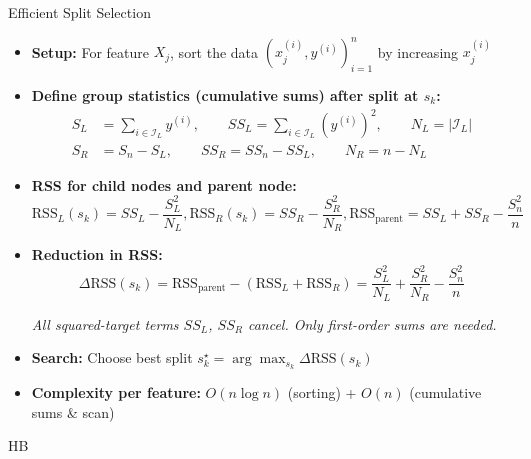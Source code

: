 \documentclass[11pt,compress,t,notes=noshow, aspectratio=169, xcolor=table]{beamer}
\begin{document}
\begin{frame}{Efficient Split Selection}
\begin{itemize}
  \item \textbf{Setup:} For feature \(X_j\), sort the data \((x_j^{(i)}, y^{(i)})_{i=1}^n\) by increasing \(x_j^{(i)}\)


  \item \textbf{Define group statistics (cumulative sums) after split at $s_k$:}
      \[
    \begin{aligned}
      S_L &= \textstyle\sum_{i \in \mathcal{I}_L} y^{(i)}, \qquad
      SS_L = \sum_{i \in \mathcal{I}_L} (y^{(i)})^2, \qquad
      N_L = |\mathcal{I}_L| \\
      S_R &= \textstyle S_n - S_L, \qquad
      SS_R = SS_n - SS_L, \qquad
      N_R = n - N_L
    \end{aligned}
    \]

  \item \textbf{RSS for child nodes and parent node:}
    \[
      \text{RSS}_L(s_k) = SS_L - \frac{S_L^2}{N_L}, 
      \text{RSS}_R(s_k) = SS_R - \frac{S_R^2}{N_R}, 
      \text{RSS}_{\text{parent}} = SS_L + SS_R - \frac{S_n^2}{n}
    \]
  \item<2-> \textbf{Reduction in RSS:}
    \[
      \Delta\text{RSS}(s_k) = \text{RSS}_{\text{parent}} - (\text{RSS}_L + \text{RSS}_R)
      = \frac{S_L^2}{N_L} + \frac{S_R^2}{N_R} - \frac{S_n^2}{n}
    \]

    \emph{All squared-target terms \( SS_L \), \( SS_R \) cancel. Only first-order sums are needed.}

  \item<2-> \textbf{Search:} Choose best split \(s_k^\star = \arg\max_{s_k} \Delta\text{RSS}(s_k)\)

  \item<2-> \textbf{Complexity per feature:}\; \(O(n\log n)\) (sorting) + \(O(n)\) (cumulative sums \& scan)
\end{itemize}
 HB\end{frame}
\end{document}
